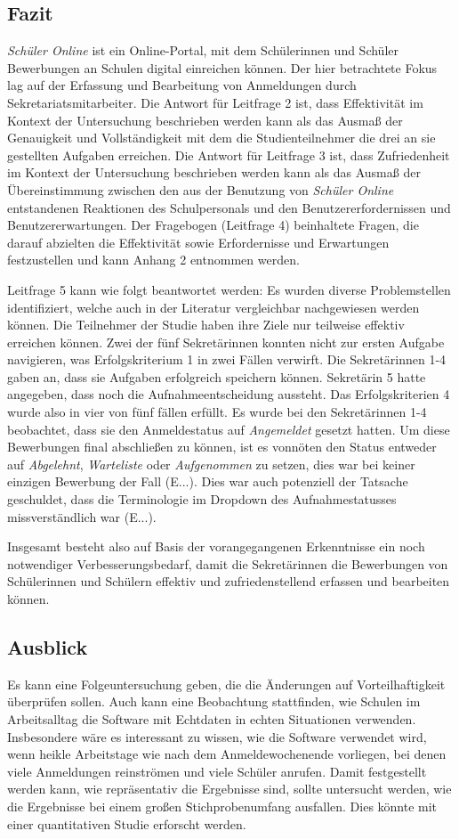 \subsection{Fazit}
\textit{Schüler Online} ist ein Online-Portal, mit dem Schülerinnen und Schüler Bewerbungen an Schulen digital einreichen können. Der hier betrachtete Fokus lag auf der Erfassung und Bearbeitung von Anmeldungen durch Sekretariatsmitarbeiter.
Die Antwort für Leitfrage 2 ist, dass Effektivität im Kontext der Untersuchung beschrieben werden kann als das Ausmaß der Genauigkeit und Vollständigkeit mit dem die Studienteilnehmer die drei an sie gestellten Aufgaben erreichen.  
Die Antwort für Leitfrage 3 ist, dass Zufriedenheit im Kontext der Untersuchung beschrieben werden kann als das Ausmaß der Übereinstimmung zwischen den aus der Benutzung von \textit{Schüler Online} entstandenen Reaktionen des Schulpersonals und den Benutzererfordernissen und Benutzererwartungen. 
Der Fragebogen (Leitfrage 4) beinhaltete Fragen, die darauf abzielten die Effektivität sowie Erfordernisse und Erwartungen festzustellen und kann Anhang 2 entnommen werden.

Leitfrage 5 kann wie folgt beantwortet werden: Es wurden diverse Problemstellen identifiziert, welche auch in der Literatur vergleichbar nachgewiesen werden können.
Die Teilnehmer der Studie haben ihre Ziele nur teilweise effektiv erreichen können. Zwei der fünf Sekretärinnen konnten nicht zur ersten Aufgabe navigieren, was Erfolgskriterium 1 in zwei Fällen verwirft. Die Sekretärinnen 1-4 gaben an, dass sie Aufgaben erfolgreich speichern können. Sekretärin 5 hatte angegeben, dass noch die Aufnahmeentscheidung aussteht. Das Erfolgskriterien 4 wurde also in vier von fünf fällen erfüllt.
Es wurde bei den Sekretärinnen 1-4 beobachtet, dass sie den Anmeldestatus auf \textit{Angemeldet} gesetzt hatten. Um diese Bewerbungen final abschließen zu können, ist es vonnöten den Status entweder auf \textit{Abgelehnt}, \textit{Warteliste} oder \textit{Aufgenommen} zu setzen, dies war bei keiner einzigen Bewerbung der Fall (E...). Dies war auch potenziell der Tatsache geschuldet, dass die Terminologie im Dropdown des Aufnahmestatusses missverständlich war (E...).

Insgesamt besteht also auf Basis der vorangegangenen Erkenntnisse ein noch notwendiger Verbesserungsbedarf, damit die Sekretärinnen die Bewerbungen von Schülerinnen und Schülern effektiv und zufriedenstellend erfassen und bearbeiten können.

\subsection{Ausblick}
Es kann eine Folgeuntersuchung geben, die die Änderungen auf Vorteilhaftigkeit überprüfen sollen.
Auch kann eine Beobachtung stattfinden, wie Schulen im Arbeitsalltag die Software mit Echtdaten in echten Situationen verwenden. Insbesondere wäre es interessant zu wissen, wie die Software verwendet wird, wenn heikle Arbeitstage wie nach dem Anmeldewochenende vorliegen, bei denen viele Anmeldungen reinströmen und viele Schüler anrufen.
Damit festgestellt werden kann, wie repräsentativ die Ergebnisse sind, sollte untersucht werden, wie die Ergebnisse bei einem großen Stichprobenumfang ausfallen. Dies könnte mit einer quantitativen Studie erforscht werden.
